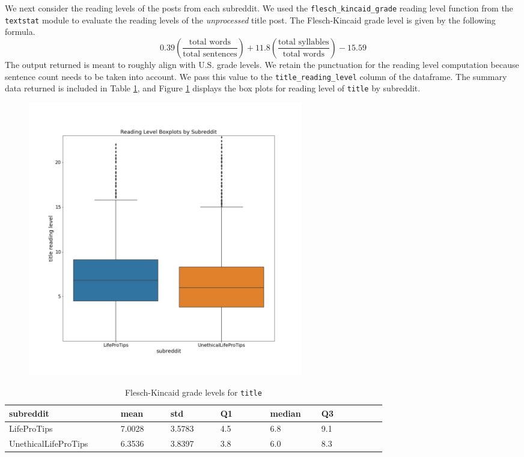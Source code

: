 \documentclass{amsart}
\theoremstyle{definition}
\theoremstyle{remark}
\begin{document}
We next consider the reading levels of the posts from each subreddit.  We used the \texttt{flesch\_kincaid\_grade} reading level function from the \texttt{textstat} module to evaluate the reading levels of the \emph{unprocessed} title post.  The Flesch-Kincaid grade level is given by the following formula. \[0.39\left(\frac{\text{total words}}{\text{total sentences}} \right) + 11.8\left(\frac{\text{total syllables}}{\text{total words}}\right) - 15.59\]  The output returned is meant to roughly align with U.S. grade levels.  We retain the punctuation for the reading level computation because sentence count needs to be taken into account. We pass this value to the \texttt{title\_reading\_level} column of the dataframe. The summary data returned is included in Table \ref{readinglevels}, and Figure \ref{readinglevel_boxplot} displays the box plots for reading level of \texttt{title} by subreddit.

\begin{figure}
\centering
\includegraphics[width=12cm]{readinglevel_boxplot.jpeg}
\label{readinglevel_boxplot} 
\end{figure}

\begin{table}
\caption{Flesch-Kincaid grade levels for \texttt{title}}\label{readinglevels}
\begin{tabular}{|p{0.2\linewidth}|p{0.1\linewidth}|p{0.1\linewidth}|p{0.1\linewidth}|p{0.1\linewidth}|p{0.13\linewidth}|}
\hline
subreddit & mean & std & Q1 & median & Q3\\
\hline
LifeProTips & 7.0028 & 3.5783 & 4.5   & 6.8 & 9.1 \\
\hline
UnethicalLifeProTips & 6.3536 & 3.8397 &  3.8  & 6.0 & 8.3 \\
\hline
\end{tabular}
\end{table}
\end{document}
